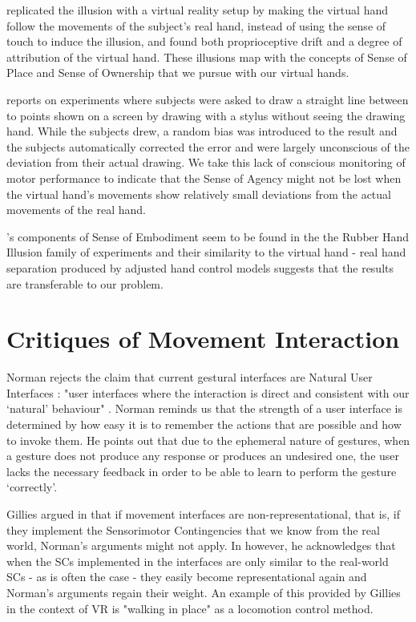 \parencite{Sanchez-Vives2010} replicated the illusion with a virtual reality setup by making the virtual hand follow the movements of the subject's real hand, instead of using the sense of touch to induce the illusion, and found both proprioceptive drift and a degree of attribution of the virtual hand. These illusions map with the concepts of Sense of Place and Sense of Ownership that we pursue with our virtual hands.

\parencite{Fourneret1998} reports on experiments where subjects were asked to draw a straight line between to points shown on a screen by drawing with a stylus without seeing the drawing hand. While the subjects drew, a random bias was introduced to the result and the subjects automatically corrected the error and were largely unconscious of the deviation from their actual drawing. We take this lack of conscious monitoring of motor performance to indicate that the Sense of Agency might not be lost when the virtual hand's movements show relatively small deviations from the actual movements of the real hand.

\parencite{Kilteni2012}'s components of Sense of Embodiment seem to be found in the the Rubber Hand Illusion family of experiments and their similarity to the virtual hand - real hand separation produced by adjusted hand control models suggests that the results are transferable to our problem.

\section{Critiques of Movement Interaction}
\label{sec:critiquesMovementInteraction}

Norman rejects the claim that current gestural interfaces are Natural User Interfaces \parencite{Norman2010}: "user interfaces where the interaction is direct and consistent with our ‘natural’ behaviour" \parencite{HvasMortensen2017}. Norman reminds us that the strength of a user interface is determined by how easy it is to remember the actions that are possible and how to invoke them. He points out that due to the ephemeral nature of gestures, when a gesture does not produce any response or produces an undesired one, the user lacks the necessary feedback in order to be able to learn to perform the gesture ‘correctly’.

Gillies argued in \parencite{Gillies2014} that if movement interfaces are non-representational, that is, if they implement the Sensorimotor Contingencies that we know from the real world, Norman's arguments might not apply. In \parencite{Gillies2016} however, he acknowledges that when the SCs implemented in the interfaces are only similar to the real-world SCs - as is often the case - they easily become representational again and Norman's arguments regain their weight. An example of this provided by Gillies in the context of VR is "walking in place" as a locomotion control method.

